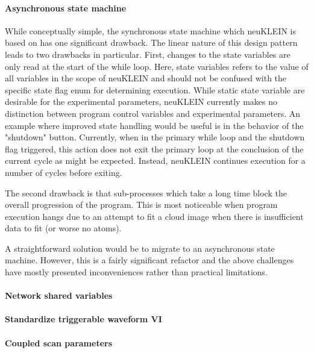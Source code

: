 \paragraph{Asynchronous state machine}
While conceptually simple, the synchronous state machine which neuKLEIN is based on has one significant drawback.
The linear nature of this design pattern leads to two drawbacks in particular.
First, changes to the state variables are only read at the start of the while loop.
Here, state variables refers to the value of all variables in the scope of neuKLEIN and should not be confused with the specific state flag enum for determining execution.
While static state variable are desirable for the experimental parameters, neuKLEIN currently makes no distinction between program control variables and experimental parameters.
An example where improved state handling would be useful is in the behavior of the "shutdown" button.
Currently, when in the primary while loop and the shutdown flag triggered, this action does not exit the primary loop at the conclusion of the current cycle as might be expected.
Instead, neuKLEIN continues execution for a number of cycles before exiting.

The second drawback is that sub-processes which take a long time block the overall progression of the program.
This is most noticeable when program execution hangs due to an attempt to fit a cloud image when there is insufficient data to fit (or worse no atoms).

A straightforward solution would be to migrate to an asynchronous state machine.
However, this is a fairly significant refactor and the above challenges have mostly presented inconveniences rather than practical limitations.

\paragraph{Network shared variables}

\paragraph{Standardize triggerable waveform VI}

\paragraph{Coupled scan parameters}